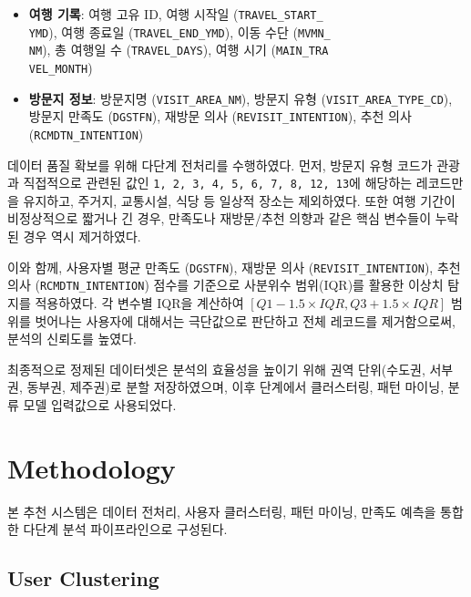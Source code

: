 \documentclass[sigconf]{acmart}
\begin{document}
\begin{CJK}{UTF8}{mj}
\begin{itemize}
  \item \textbf{여행 기록}: 여행 고유 ID, 여행 시작일 (\texttt{TRAVEL\_START\_\\YMD}), 여행 종료일 (\texttt{TRAVEL\_END\_YMD}), 이동 수단 (\texttt{MVMN\_\\NM}), 총 여행일 수 (\texttt{TRAVEL\_DAYS}), 여행 시기 (\texttt{MAIN\_TRA\\VEL\_MONTH})
  
  \item \textbf{방문지 정보}: 방문지명 (\texttt{VISIT\_AREA\_NM}), 방문지 유형 (\texttt{VISIT\_AREA\_TYPE\_CD}), 방문지 만족도 (\texttt{DGSTFN}), 재방문 의사 (\texttt{REVISIT\_INTENTION}), 추천 의사 (\texttt{RCMDTN\_INTENTION})
  
\end{itemize}

데이터 품질 확보를 위해 다단계 전처리를 수행하였다. 먼저, 방문지 유형 코드가 관광과 직접적으로 관련된 값인 \texttt{1, 2, 3, 4, 5, 6, 7, 8, 12, 13}에 해당하는 레코드만을 유지하고, 주거지, 교통시설, 식당 등 일상적 장소는 제외하였다. 또한 여행 기간이 비정상적으로 짧거나 긴 경우, 만족도나 재방문/추천 의향과 같은 핵심 변수들이 누락된 경우 역시 제거하였다.

이와 함께, 사용자별 평균 만족도 (\texttt{DGSTFN}), 재방문 의사 (\texttt{REVISIT\_INTENTION}), 추천 의사 (\texttt{RCMDTN\_INTENTION}) 점수를 기준으로 사분위수 범위(IQR)를 활용한 이상치 탐지를 적용하였다. 각 변수별 IQR을 계산하여 \([Q1 - 1.5 \times IQR, Q3 + 1.5 \times IQR]\) 범위를 벗어나는 사용자에 대해서는 극단값으로 판단하고 전체 레코드를 제거함으로써, 분석의 신뢰도를 높였다.

최종적으로 정제된 데이터셋은 분석의 효율성을 높이기 위해 권역 단위(수도권, 서부권, 동부권, 제주권)로 분할 저장하였으며, 이후 단계에서 클러스터링, 패턴 마이닝, 분류 모델 입력값으로 사용되었다.



\section{Methodology} %

본 추천 시스템은 데이터 전처리, 사용자 클러스터링, 패턴 마이닝, 만족도 예측을 통합한 다단계 분석 파이프라인으로 구성된다.

\subsection{User Clustering}


\end{CJK}
\end{document}
